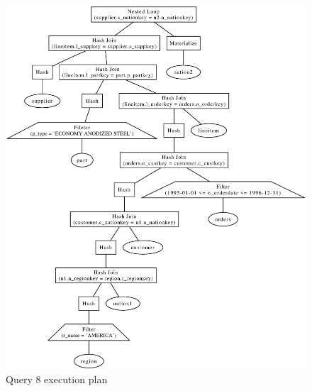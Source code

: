 \documentclass[11pt,a4paper]{jsarticle}
\begin{document}
\begin{figure}[thbp]
 \begin{center}
  \includegraphics[width=170mm]{query8.eps}
 \end{center}
 \caption{Query 8 execution plan}
 \label{fig:query8}
\end{figure}

\clearpage
\end{document}
